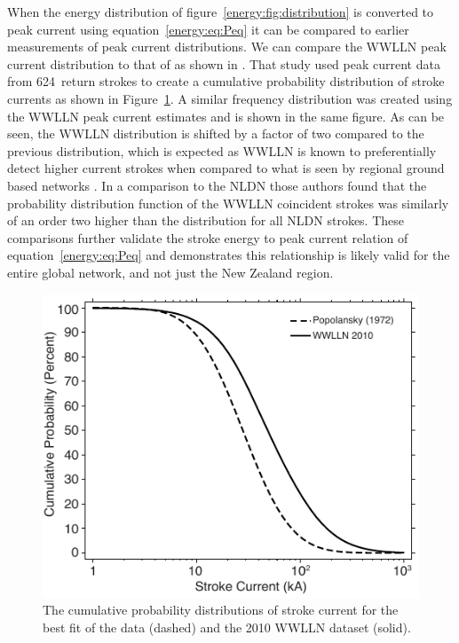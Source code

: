 When the energy distribution of figure~\ref{energy:fig:distribution} is converted to peak current using equation~\ref{energy:eq:Peq} it can be compared to earlier measurements of peak current distributions.
We can compare the WWLLN peak current distribution to that of \citet{Popolansky1972} as shown in \citet{Golde1977}.
That study used peak current data from 624~return strokes to create a cumulative probability distribution of stroke currents as shown in Figure~\ref{energy:fig:PPS_CDF}.
A similar frequency distribution was created using the WWLLN peak current estimates and is shown in the same figure.
As can be seen, the WWLLN distribution is shifted by a factor of two compared to the previous distribution, which is expected as WWLLN is known to preferentially detect higher current strokes when compared to what is seen by regional ground based networks \citep{Abarca2010}.
In a comparison to the NLDN those authors found that the probability distribution function of the WWLLN coincident strokes was similarly of an order two higher than the distribution for all NLDN strokes.
These comparisons further validate the stroke energy to peak current relation of equation~\ref{energy:eq:Peq} and demonstrates this relationship is likely valid for the entire global network, and not just the New Zealand region.

\begin{figure}[ht!]
\centering
\includegraphics[scale=1]{energy/Figures/PPS_CDF.pdf}
\caption{The cumulative probability distributions of stroke current for the best fit of the \citet{Popolansky1972} data (dashed) and the 2010 WWLLN dataset (solid).}
\label{energy:fig:PPS_CDF}
\end{figure}

